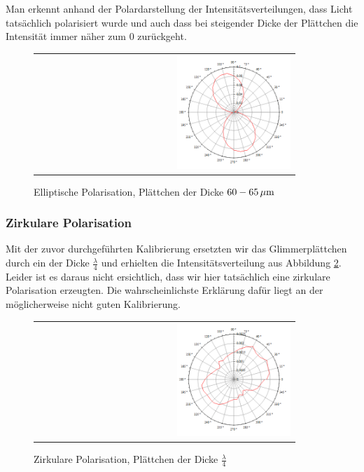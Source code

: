 \documentclass[a4paper,titlepage]{scrartcl}
\numberwithin{equation}{section}
\begin{document}
Man erkennt anhand der Polardarstellung der Intensitätsverteilungen, dass Licht tatsächlich polarisiert wurde und auch dass bei steigender Dicke der Plättchen die Intensität immer näher zum 0 zurückgeht.
\begin{figure}[H]
	\centering
	\begin{tabular}{@{}r@{}}
		\includegraphics[width=0.45\textwidth]{bilder/1f.png}\\
	\end{tabular}
	\caption{Elliptische Polarisation, Plättchen der Dicke $\unit[60-65]{\mu m}$}
	\label{fig:aufgabe1f}
\end{figure}
\subsubsection{Zirkulare Polarisation}
Mit der zuvor durchgeführten Kalibrierung ersetzten wir das Glimmerplättchen durch ein der Dicke $\frac{\lambda}{4}$ und erhielten die Intensitätsverteilung aus Abbildung \ref{fig:aufgabe1c}. Leider ist es daraus nicht ersichtlich, dass wir hier tatsächlich eine zirkulare Polarisation erzeugten. Die wahrscheinlichste Erklärung dafür liegt an der möglicherweise nicht guten Kalibrierung.
\begin{figure}[H]
	\centering
	\begin{tabular}{@{}r@{}}
		\includegraphics[width=0.45\textwidth]{bilder/1c.png}\\
	\end{tabular}
	\caption{Zirkulare Polarisation, Plättchen der Dicke $\frac{\lambda}{4}$}
	\label{fig:aufgabe1c}
\end{figure}
\end{document}
